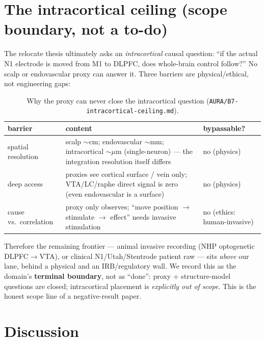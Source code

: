 \documentclass[11pt,a4paper]{article}
\begin{document}
\section{The intracortical ceiling (scope boundary, not a to-do)}
\label{sec:ceiling}

The relocate thesis ultimately asks an \emph{intracortical} causal question:
``if the actual N1 electrode is moved from M1 to DLPFC, does whole-brain
control follow?'' No scalp or endovascular proxy can answer it. Three barriers
are physical/ethical, not engineering gaps:

\begin{table}[h]
\centering
\caption{Why the proxy can never close the intracortical question
(\texttt{AURA/B7-intracortical-ceiling.md}).}
\label{tab:ceiling}
\small
\begin{tabular}{@{}lp{7.2cm}l@{}}
\toprule
barrier & content & bypassable? \\
\midrule
spatial resolution & scalp $\sim$cm; endovascular $\sim$mm; intracortical
$\sim\mu$m (single-neuron) --- the integration resolution itself differs &
no (physics) \\
deep access & proxies see cortical surface / vein only; VTA/LC/raphe direct
signal is zero (even endovascular is a surface) & no (physics) \\
cause vs.\ correlation & proxy only observes; ``move position $\to$ stimulate
$\to$ effect'' needs invasive stimulation & no (ethics: human-invasive) \\
\bottomrule
\end{tabular}
\end{table}

\noindent
Therefore the remaining frontier --- animal invasive recording
(NHP optogenetic DLPFC$\to$VTA), or clinical N1/Utah/Stentrode patient raw ---
sits \emph{above} our lane, behind a physical and an IRB/regulatory wall. We
record this as the domain's \textbf{terminal boundary}, not as ``done'':
proxy + structure-model questions are closed; intracortical placement is
\emph{explicitly out of scope}. This is the honest scope line of a
negative-result paper.

\section{Discussion}\label{sec:discussion}
\end{document}
